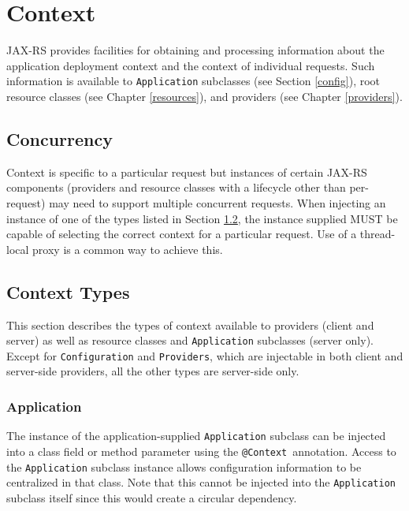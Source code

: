 \chapter{Context}
\label{context}

JAX-RS provides facilities for obtaining and processing information about the application deployment context and the
context of individual requests. Such information is available to \lstinline{Application} subclasses (see
Section \ref{config}), root resource classes (see Chapter \ref{resources}), and providers (see Chapter \ref{providers}).

\section{Concurrency}

Context is specific to a particular request but instances of certain JAX-RS components (providers and resource classes
with a lifecycle other than per-request) may need to support multiple concurrent requests. When injecting an instance of
one of the types listed in Section \ref{contexttypes}, the instance supplied MUST be capable of selecting the correct
context for a particular request. Use of a thread-local proxy is a common way to achieve this.

\section{Context Types}
\label{contexttypes}

This section describes the types of context available to providers (client and server) as well as resource classes and
\lstinline{Application} subclasses (server only). Except for \lstinline{Configuration} and \lstinline{Providers}, which
are injectable in both client and server-side providers, all the other types are server-side only.

\subsection{Application}

The instance of the application-supplied \lstinline{Application} subclass can be injected into a class field or method
parameter using the \lstinline{@Context}\ annotation. Access to the \lstinline{Application} subclass instance allows
configuration information to be centralized in that class. Note that this cannot be injected into the
\lstinline{Application} subclass itself since this would create a circular dependency.

